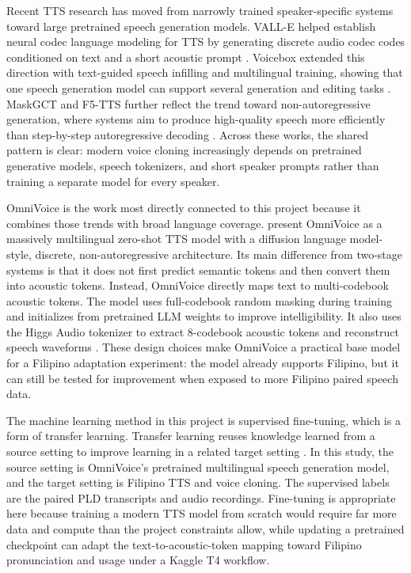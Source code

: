 \documentclass[11pt]{article}
\begin{document}
Recent TTS research has moved from narrowly trained speaker-specific systems toward large pretrained speech generation models. VALL-E helped establish neural codec language modeling for TTS by generating discrete audio codec codes conditioned on text and a short acoustic prompt \citep{valle}. Voicebox extended this direction with text-guided speech infilling and multilingual training, showing that one speech generation model can support several generation and editing tasks \citep{voicebox}. MaskGCT and F5-TTS further reflect the trend toward non-autoregressive generation, where systems aim to produce high-quality speech more efficiently than step-by-step autoregressive decoding \citep{maskgct,f5tts}. Across these works, the shared pattern is clear: modern voice cloning increasingly depends on pretrained generative models, speech tokenizers, and short speaker prompts rather than training a separate model for every speaker.

OmniVoice is the work most directly connected to this project because it combines those trends with broad language coverage. \citet{omnivoice} present OmniVoice as a massively multilingual zero-shot TTS model with a diffusion language model-style, discrete, non-autoregressive architecture. Its main difference from two-stage systems is that it does not first predict semantic tokens and then convert them into acoustic tokens. Instead, OmniVoice directly maps text to multi-codebook acoustic tokens. The model uses full-codebook random masking during training and initializes from pretrained LLM weights to improve intelligibility. It also uses the Higgs Audio tokenizer to extract 8-codebook acoustic tokens and reconstruct speech waveforms \citep{omnivoice,higgsaudio}. These design choices make OmniVoice a practical base model for a Filipino adaptation experiment: the model already supports Filipino, but it can still be tested for improvement when exposed to more Filipino paired speech data.

The machine learning method in this project is supervised fine-tuning, which is a form of transfer learning. Transfer learning reuses knowledge learned from a source setting to improve learning in a related target setting \citep{transferlearning}. In this study, the source setting is OmniVoice's pretrained multilingual speech generation model, and the target setting is Filipino TTS and voice cloning. The supervised labels are the paired PLD transcripts and audio recordings. Fine-tuning is appropriate here because training a modern TTS model from scratch would require far more data and compute than the project constraints allow, while updating a pretrained checkpoint can adapt the text-to-acoustic-token mapping toward Filipino pronunciation and usage under a Kaggle T4 workflow.
\end{document}
